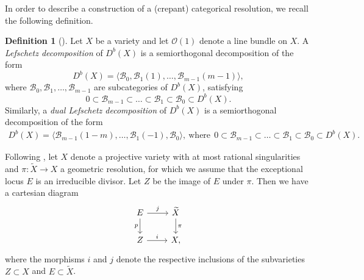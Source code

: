 \documentclass[a4paper, twoside, 11pt]{amsart}
\theoremstyle{definition}
\newtheorem{definition}[theorem]{Definition}
\theoremstyle{remark}
\numberwithin{equation}{theorem}
\newcommand{\dbx}{D^b(X)}
\begin{document}
In order to describe a construction of a (crepant) categorical resolution, we recall the following definition.
\begin{definition}[{\cite[Definition 2.16]{Lefschetz_Decomp}}]\label{Dual_Lefschetz_decomp}
	Let $X$ be a variety and let $\mathcal{O}(1)$ denote a line bundle on $X$. A \textit{Lefschetz decomposition} of $\dbx$  is a semiorthogonal decomposition of the form 
	\begin{equation*}
		\dbx = \langle \mathcal{B}_0, \mathcal{B}_1(1), \dots,\mathcal{B}_{m-1}(m-1) \rangle, 
	\end{equation*}
	where $\mathcal{B}_0, \mathcal{B}_1, \dots, \mathcal{B}_{m-1}$ are subcategories of $\dbx$, satisfying
	\begin{equation*}
		0 \subset \mathcal{B}_{m-1} \subset \dots \subset \mathcal{B}_1 \subset \mathcal{B}_0 \subset \dbx.
	\end{equation*}
	Similarly, a \textit{dual Lefschetz decomposition} of $\dbx$  is a semiorthogonal decomposition of the form 
	\begin{align*}
	    \dbx = \langle \mathcal{B}_{m-1}(1-m),\dots, \mathcal{B}_1(-1), \mathcal{B}_0\rangle, \  \text{where} \ \ 0 \subset \mathcal{B}_{m-1} \subset \dots \subset \mathcal{B}_1 \subset \mathcal{B}_0 \subset \dbx. 
	\end{align*}
\end{definition}
Following \cite[§4]{Lefschetz_Decomp}, let $X$ denote a projective variety with at most rational singularities and $\pi\colon \widetilde{X} \to X$ a geometric resolution, for which we assume that the exceptional locus $E$ is an irreducible divisor. Let $Z$ be the image of $E$ under $\pi$. Then we have a cartesian diagram 
\begin{equation}\label{gerneral_square}
	\begin{tikzcd}
		E \arrow[d, "p"'] \arrow[r, "j"] & \widetilde{X} \arrow[d, "\pi"] \\
		Z \arrow[r, "i"]                     & X,                             
	\end{tikzcd}
\end{equation}
where the morphisms $i$ and $j$ denote the respective inclusions of the subvarieties $Z \subset X$ and $E \subset \widetilde{X}$.
\end{document}
